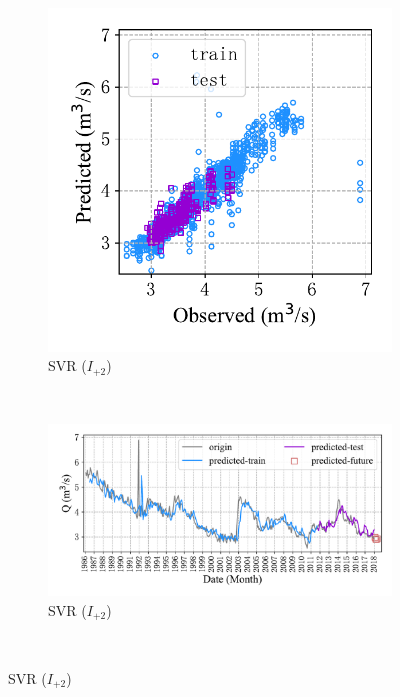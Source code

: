 \begin{figure}[!htbp]
\begin{subfigure}[b]{0.615\textwidth}
  \end{subfigure}
  \\
  \begin{subfigure}[b]{0.305\textwidth}
    \includegraphics[width=\textwidth]{Img/chap4_spr/out4/spr_scatter_in_2_out_4_svr.pdf}
    \vspace{-1.2cm}
    \caption{SVR ($I_{+2}$)}
    \label{fig:spr_scatter_in_2_out_4_svr}
  \end{subfigure}
  ~
  \begin{subfigure}[b]{0.615\textwidth}
    \includegraphics[width=\textwidth]{Img/chap4_spr/out4/spr_series_in_2_out_4_svr.pdf}
    \vspace{-1.2cm}
    \caption{SVR ($I_{+2}$)}
    \label{fig:spr_series_in_2_out_4_svr}
  \end{subfigure}
  \\



\end{figure}
